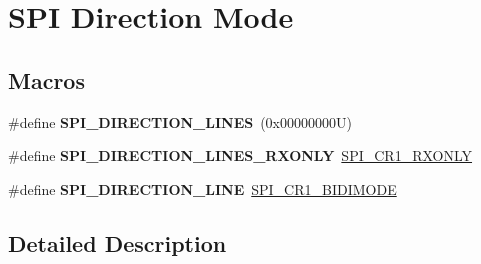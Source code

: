 \hypertarget{group___s_p_i___direction}{}\section{S\+PI Direction Mode}
\label{group___s_p_i___direction}
\subsection*{Macros}
\begin{DoxyCompactItemize}
\item 
\mbox{\label{group___s_p_i___direction_gaa7cb7f4bf4eebbf91bcfaeb17ebba7f3}} 
\#define {\bfseries S\+P\+I\+\_\+\+D\+I\+R\+E\+C\+T\+I\+O\+N\+\_\+L\+I\+N\+ES}~(0x00000000\+U)
\item 
\mbox{\label{group___s_p_i___direction_ga444826cf94667f75503f54704b2fb391}} 
\#define {\bfseries S\+P\+I\+\_\+\+D\+I\+R\+E\+C\+T\+I\+O\+N\+\_\+L\+I\+N\+E\+S\+\_\+\+R\+X\+O\+N\+LY}~\hyperlink{group___peripheral___registers___bits___definition_ga9ffecf774b84a8cdc11ab1f931791883}{S\+P\+I\+\_\+\+C\+R1\+\_\+\+R\+X\+O\+N\+LY}
\item 
\mbox{\label{group___s_p_i___direction_gab0f684caf5f1d6ac1e73d90a4778ab93}} 
\#define {\bfseries S\+P\+I\+\_\+\+D\+I\+R\+E\+C\+T\+I\+O\+N\+\_\+L\+I\+NE}~\hyperlink{group___peripheral___registers___bits___definition_ga43608d3c2959fc9ca64398d61cbf484e}{S\+P\+I\+\_\+\+C\+R1\+\_\+\+B\+I\+D\+I\+M\+O\+DE}
\end{DoxyCompactItemize}


\subsection{Detailed Description}
